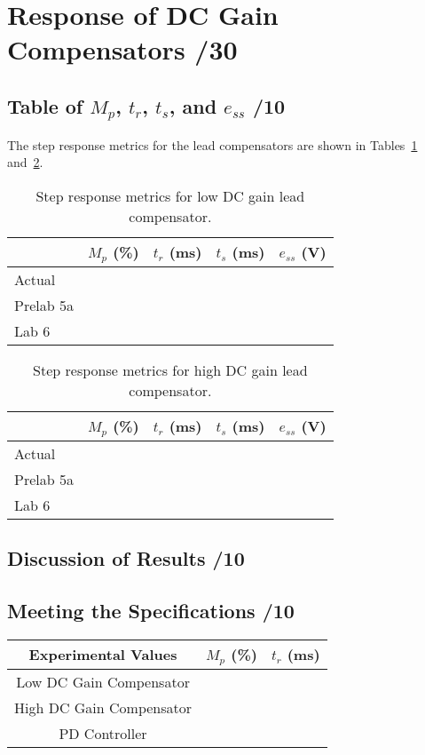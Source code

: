 \documentclass{article}
\newcommand{\score}{\hfill \underline{\hspace{1cm}}/}
\begin{document}
\section{{\sc Response of DC Gain Compensators} \score 30}
\subsection{Table of $M_p$, $t_r$, $t_s$, and $e_{ss}$ \score 10}
The step response metrics for the lead compensators are shown in Tables~\ref{tab:srml} and~\ref{tab:srmh}.
\begin{table}[htb]
\centering
\begin{tabular}{lrrrr}
& $M_p$ (\%) & $t_r$ (ms) & $t_s$ (ms) & $e_{ss}$ (V) \\
\hline
Actual & & & & \\
Prelab 5a & & & &\\
Lab 6 & & & &
\end{tabular}
\caption{Step response metrics for low DC gain lead compensator.}
\label{tab:srml}
\end{table}

\begin{table}[htb]
\centering
\begin{tabular}{lrrrr}
& $M_p$ (\%) & $t_r$ (ms) & $t_s$ (ms) & $e_{ss}$ (V) \\
\hline
Actual & & & & \\
Prelab 5a & & & &\\
Lab 6 & & & &
\end{tabular}
\caption{Step response metrics for high DC gain lead compensator.}
\label{tab:srmh}
\end{table}

\subsection{Discussion of Results \score 10}


\subsection{Meeting the Specifications \score 10}
\begin{center}
\begin{tabular}{crr}
Experimental Values & $M_p$ (\%) & $t_r$ (ms) \\
\hline
Low DC Gain Compensator & & \\
High DC Gain Compensator & & \\
PD Controller & &
\end{tabular}
\end{center}
\end{document}
